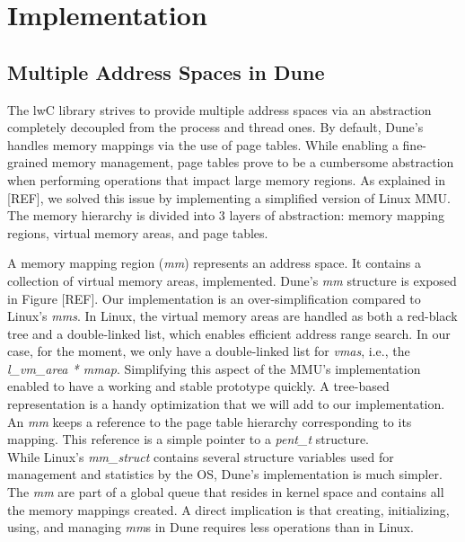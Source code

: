 \chapter{Implementation}
%
%
%


\section{Multiple Address Spaces in Dune}
The lwC library strives to provide multiple address spaces via an abstraction completely decoupled from the process and thread ones.
By default, Dune's handles memory mappings via the use of page tables.
While enabling a fine-grained memory management, page tables prove to be a cumbersome abstraction when performing operations that impact large memory regions.
As explained in [REF], we solved this issue by implementing a simplified version of Linux MMU.
The memory hierarchy is divided into 3 layers of abstraction: memory mapping regions, virtual memory areas, and page tables.

A memory mapping region (\emph{mm}) represents an address space.
It contains a collection of virtual memory areas, implemented.
Dune's \emph{mm} structure is exposed in Figure [REF].
Our implementation is an over-simplification compared to Linux's \emph{mms}.
In Linux, the virtual memory areas are handled as both a red-black tree and a double-linked list, which enables  efficient address range search.
In our case, for the moment, we only have a double-linked list for \emph{vmas}, i.e., the \emph{l\_vm\_area * mmap}.
Simplifying this aspect of the MMU's implementation enabled to have a working and stable prototype quickly.
A tree-based representation is a handy optimization that we will add to our implementation.\\
An \emph{mm} keeps a reference to the page table hierarchy corresponding to its mapping.
This reference is a simple pointer to a \emph{pent_t} structure.\\
While Linux's \emph{mm_struct} contains several structure variables used for management and statistics by the OS, Dune's implementation is much simpler.
The \emph{mm} are part of a global queue that resides in kernel space and contains all the memory mappings created.
A direct implication is that creating, initializing, using, and managing \emph{mm}s in Dune requires less operations than in Linux.






